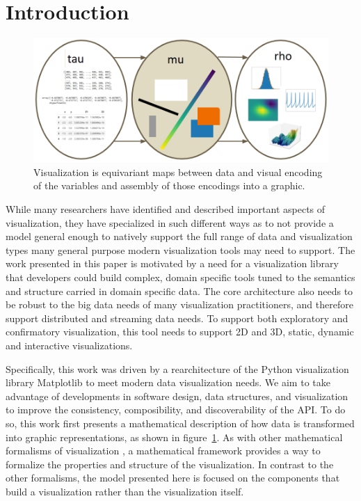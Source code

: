 \documentclass[../main.tex]{subfiles}
\begin{document}
\section{Introduction}
\label{sec:intro}
\begin{figure}[H]
    \includegraphics[width=\textwidth]{figures/math/dar.png}
    \caption{Visualization is equivariant maps between data and visual encoding of the variables and assembly of those encodings into a graphic.
    }
    \label{fig:intro_artist_stages}
\end{figure}

While many researchers have identified and described important aspects of visualization, they have specialized in such different ways as to not provide a model general enough to natively support the full range of data and visualization types many general purpose modern visualization tools may need to support. The work presented in this paper is motivated by a need for a visualization library that developers could build complex, domain specific tools tuned to the semantics and structure carried in domain specific data. The core architecture also needs to be robust to the big data needs of many visualization practitioners, and therefore support distributed and streaming data needs. To support both exploratory and confirmatory visualization\cite{tukeyWeNeedBoth1980}, this tool needs to support 2D and 3D, static, dynamic and interactive visualizations. 

Specifically, this work was driven by a rearchitecture of the Python visualization library Matplotlib\cite{hunterMatplotlib2DGraphics2007} to meet modern data visualization needs. We aim to take advantage of developments in software design, data structures, and visualization to improve the consistency, composibility, and discoverability of the API. To do so, this work first presents a mathematical description of how data is transformed into graphic representations, as shown in figure~\ref{fig:intro_artist_stages}. As with other mathematical formalisms of visualization \cite{mackinlayAutomatingDesignGraphical1986,kindlmann2014algebraic,sugibuchiFramwork2009,vickersUnderstandingViz2013}, a mathematical framework provides a way to formalize the properties and structure of the visualization. In contrast to the other formalisms, the model presented here is focused on the components that build a visualization rather than the visualization itself. 
\end{document}
